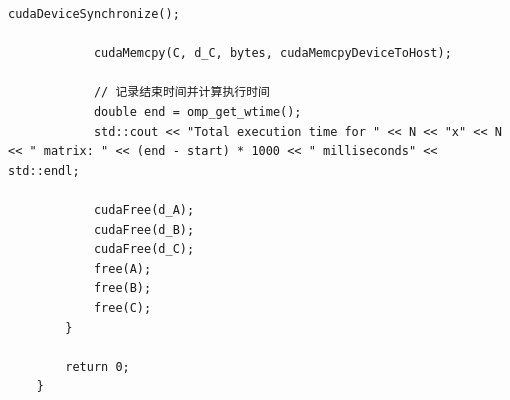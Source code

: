 \documentclass{article}
\begin{document}
\begin{lstlisting}[style=cstyle,caption={OpenMP和CUDA混合编程}]
            cudaDeviceSynchronize();
    
            cudaMemcpy(C, d_C, bytes, cudaMemcpyDeviceToHost);
    
            // 记录结束时间并计算执行时间
            double end = omp_get_wtime();
            std::cout << "Total execution time for " << N << "x" << N << " matrix: " << (end - start) * 1000 << " milliseconds" << std::endl;
    
            cudaFree(d_A);
            cudaFree(d_B);
            cudaFree(d_C);
            free(A);
            free(B);
            free(C);
        }
    
        return 0;
    }
    
\end{lstlisting}
\end{document}
